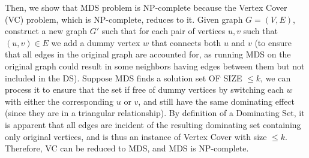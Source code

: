 \documentclass[11pt]{article}
\theoremstyle{definition}
\theoremstyle{remark}
\begin{document}
Then, we show that MDS problem is NP-complete because the Vertex Cover (VC) problem, which is NP-complete, reduces to it. Given graph $G = (V,E)$, construct a new graph $G'$ such that for each pair of vertices $u,v$ such that $(u,v) \in E$ we add a dummy vertex $w$ that connects both $u$ and $v$ (to ensure that all edges in the original graph are accounted for, as running MDS on the original graph could result in some neighbors having edges between them but not included in the DS). Suppose MDS finds a solution set OF SIZE $\leq k$, we can process it to ensure that the set if free of dummy vertices by switching each $w$ with either the corresponding $u$ or $v$, and still have the same dominating effect (since they are in a triangular relationship). By definition of a Dominating Set, it is apparent that all edges are incident of the resulting dominating set containing only original vertices, and is thus an instance of Vertex Cover with size $\leq k$. Therefore, VC can be reduced to MDS, and MDS is NP-complete. 
\clearpage
\end{document}
